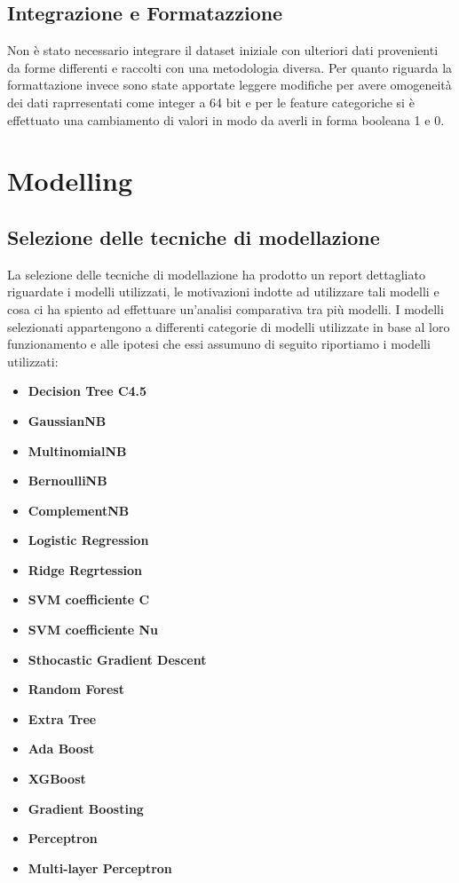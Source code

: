 \documentclass[italian,12pt,a4paper]{article}
\begin{document}
    \subsection{Integrazione e Formatazzione}
    Non è stato necessario integrare il dataset iniziale con ulteriori dati provenienti da forme differenti e raccolti con una metodologia diversa. Per quanto riguarda la formattazione invece sono state apportate leggere modifiche per avere omogeneità dei dati raprresentati come integer a 64 bit e per le feature categoriche si è effettuato una cambiamento di valori in modo da averli in forma booleana 1 e 0.

    \section{Modelling}
    \subsection{Selezione delle tecniche di modellazione}
    La selezione delle tecniche di modellazione ha prodotto un report dettagliato riguardate i modelli utilizzati, le motivazioni indotte ad utilizzare tali modelli e cosa ci ha spiento ad effettuare un'analisi comparativa tra  più modelli. I modelli selezionati appartengono a differenti categorie di modelli utilizzate in base al loro funzionamento e alle ipotesi che essi assumuno di seguito riportiamo i modelli utilizzati:
    
    \begin{itemize}
		\item \textbf{Decision Tree C4.5}
		\item \textbf{GaussianNB}
        \item \textbf{MultinomialNB}
        \item \textbf{BernoulliNB}
        \item \textbf{ComplementNB}
        \item \textbf{Logistic Regression}
        \item \textbf{Ridge Regrtession}
        \item \textbf{SVM coefficiente C}
        \item \textbf{SVM coefficiente Nu}
        \item \textbf{Sthocastic Gradient Descent}
        \item \textbf{Random Forest}
        \item \textbf{Extra Tree}
        \item \textbf{Ada Boost}
        \item \textbf{XGBoost}
        \item \textbf{Gradient Boosting}
        \item \textbf{Perceptron}
        \item \textbf{Multi-layer Perceptron}
	\end{itemize}
\end{document}

